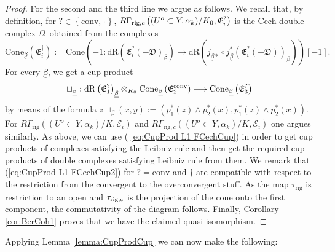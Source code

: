\documentclass[asterisque,english]{smfart}
\begin{document}
\begin{proof}
For the second and the third line we argue as follows. We recall that, by
definition, for $?\in \left\{ \mathrm{conv},\dagger \right\} $, $R\Gamma _{%
\mathrm{rig},c}\left( (U^{o}\subset Y,\alpha _{k})/K_{0},\mathfrak{E}%
_{i}^{?}\right) $ is the Cech double complex $\Omega $\ obtained from the
complexes%
\begin{equation*}
\mathrm{Cone}_{\underline{\beta }}\left( \mathfrak{E}_{i}^{\dag }\right) :=%
\mathrm{Cone}\left( -1:\mathrm{dR}\left( \mathfrak{E}_{i}^{?}\left( -%
\mathfrak{D}\right) _{\underline{\beta }}\right) \longrightarrow \mathrm{dR}%
\left( j_{\underline{\beta }\ast }\circ j_{\underline{\beta }}^{\ast }\left( 
\mathfrak{E}_{i}^{?}\left( -\mathfrak{D}\right) \right) _{\underline{\beta }%
}\right) \right) \left[ -1\right] \text{.}
\end{equation*}%
For every $\underline{\beta }$, we get a cup product%
\begin{equation}
\sqcup _{\underline{\beta }}:\mathrm{dR}\left( \mathfrak{E}_{1}^{?}\right) _{%
\underline{\beta }}\otimes _{K_{0}}\mathrm{Cone}_{\underline{\beta }}\left( 
\mathfrak{E}_{2}^{\mathrm{conv}}\right) \longrightarrow \mathrm{Cone}_{%
\underline{\beta }}\left( \mathfrak{E}_{3}^{?}\right) 
\label{eq:CupProd L1 FCechCup2}
\end{equation}%
by means of the formula $z\sqcup _{\underline{\beta }}\left( x,y\right)
:=\left( p_{1}^{\ast }\left( z\right) \wedge p_{2}^{\ast }\left( x\right)
,p_{1}^{\ast }\left( z\right) \wedge p_{2}^{\ast }\left( x\right) \right) $.
For $R\Gamma _{\mathrm{rig}}\left( (U^{o}\subset Y,\alpha _{k})/K,\mathcal{E}%
_{i}\right) $ and $R\Gamma _{\mathrm{rig},c}\left( (U^{o}\subset Y,\alpha
_{k})/K,\mathcal{E}_{i}\right) $ one argues similarly. As above, we can use (%
\ref{eq:CupProd L1 FCechCup}) in order to get cup products of complexes
satisfying the Leibniz rule and then get the required cup products of double
complexes satisfying Leibniz rule from them. We remark that (\ref{eq:CupProd
L1 FCechCup2}) for $?=\mathrm{conv}$ and $\dagger $ are compatible with
respect to the restriction from the convergent to the overconvergent stuff.
As the map $\tau _{\mathrm{rig}}$ is restriction to an open and $\tau _{%
\mathrm{rig,c}}$ is the projection of the cone onto the first component, the
commutativity of the diagram follows. Finally, Corollary \ref{cor:BerCoh1}
proves that we have the claimed quasi-isomorphism.
\end{proof}


Applying Lemma \ref{lemma:CupProdCup}  we can now make the following:
\end{document}
